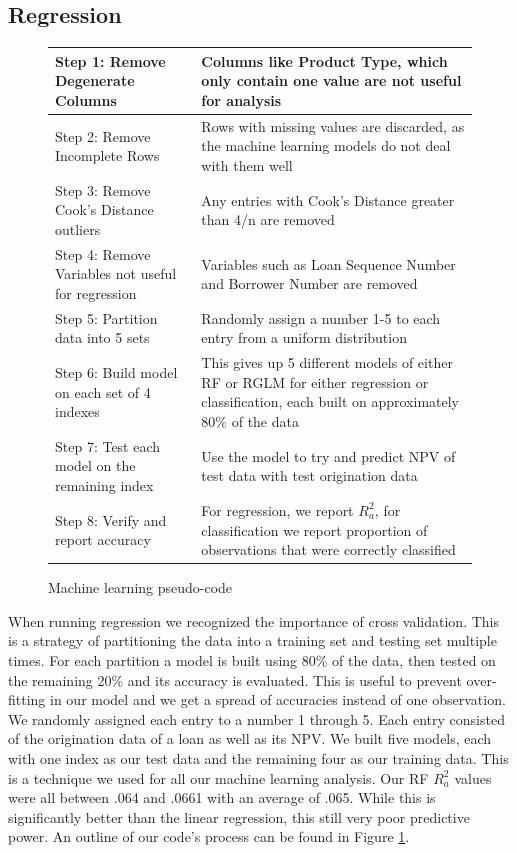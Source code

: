 \documentclass[12 pt]{uncw_thesis}
\theoremstyle{plain}
\theoremstyle{remark}
\theoremstyle{definition}
\begin{document}
\subsection{Regression}
\begin{figure}
\begin{center}
	\begin{tabular}{|M{5.5cm}|M{8.75cm}|}
		\hline
		Step 1: Remove Degenerate Columns & Columns like Product Type, which only contain one value are not useful for analysis\\
		\hline
		Step 2: Remove Incomplete Rows & Rows with missing values are discarded, as the machine learning models do not deal with them well\\
		\hline
		Step 3: Remove Cook's Distance outliers & Any entries with Cook's Distance greater than 4/n are removed\\
		\hline
		Step 4: Remove Variables not useful for regression & Variables such as Loan Sequence Number and Borrower Number are removed\\
		\hline
		Step 5: Partition data into 5 sets & Randomly assign a number 1-5 to each entry from a uniform distribution\\
		\hline
		Step 6: Build model on each set of 4 indexes & This gives up 5 different models of either RF or RGLM for either regression or classification, each built on approximately 80\% of the data\\
		\hline
		Step 7: Test each model on the remaining index & Use the model to try and predict NPV of test data with test origination data\\
		\hline
		Step 8: Verify and report accuracy & For regression, we report \(R_a^2\), for classification we report proportion of observations that were correctly classified\\ 
		\hline
	\end{tabular}
\end{center}
\caption{Machine learning pseudo-code} \label{fig:MLCode}
\end{figure}
When running regression we recognized the importance of cross validation. This is a strategy of partitioning the data into a training set and testing set multiple times. For each partition a model is built using 80\% of the data, then tested on the remaining 20\% and  its accuracy is evaluated. This is useful to prevent over-fitting in our model and we get a spread of accuracies instead of one observation. We randomly assigned each entry to a number 1 through 5. Each entry consisted of the origination data of a loan as well as its NPV. We built five models, each with one index as our test data and the remaining four as our training data. This is a technique we used for all our machine learning analysis. Our RF \(R_a^2\) values were all between .064 and .0661 with an average of .065. While this is significantly better than the linear regression, this still very poor predictive power. An outline of our code's process can be found in Figure \ref{fig:MLCode}.
\end{document}
